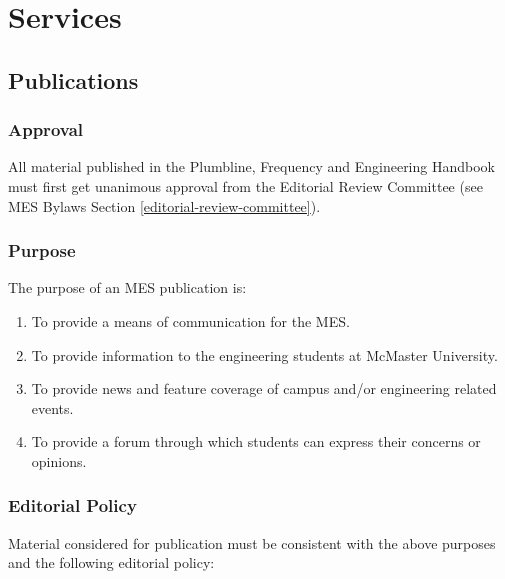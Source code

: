 \section{Services}
\label{services}

\subsection{Publications}
\label{publications}

\subsubsection{Approval}
\label{approval}
All material published in the Plumbline, Frequency and Engineering
Handbook must first get unanimous approval from the Editorial Review
Committee (see MES Bylaws Section \ref{editorial-review-committee}).

\subsubsection{Purpose}
\label{purpose}
The purpose of an MES publication is:

\begin{enumerate}
 \item
  To provide a means of communication for the MES.
 \item
  To provide information to the engineering students at McMaster University.
 \item
  To provide news and feature coverage of campus and/or engineering related events.
 \item
  To provide a forum through which students can express their concerns or opinions.

\end{enumerate}

\subsubsection{Editorial Policy}
\label{editorial-policy}
Material considered for publication must be consistent with the above
purposes and the following editorial policy:

